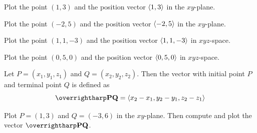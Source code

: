 \documentclass[letterpaper, twoside, 12pt]{book}
\begin{document}
          \begin{problem}
            Plot the point $(1,3)$ and the position vector
            $\langle1,3\rangle$ in the $xy$-plane.
          \end{problem}

          \begin{solution}

          \end{solution}

          \begin{problem}
            Plot the point $(-2,5)$ and the position vector
            $\langle-2,5\rangle$ in the $xy$-plane.
          \end{problem}

          \begin{solution}

          \end{solution}

          \begin{problem}
            Plot the point $(1,1,-3)$ and the position vector
            $\langle1,1,-3\rangle$ in $xyz$-space.
          \end{problem}

          \begin{solution}

          \end{solution}

          \begin{problem}
            Plot the point $(0,5,0)$ and the position vector
            $\langle0,5,0\rangle$ in $xyz$-space.
          \end{problem}

          \begin{solution}

          \end{solution}





\begin{definition}
  Let $P = \left(x_1,y_1,z_1\right)$ and $Q = \left(x_2,y_2,z_2\right).$
  Then the vector with initial point $P$ and terminal point $Q$ is defined as
  \[
    \harpvec{PQ} = \threevec{x_2 - x_1}{y_2 - y_1}{z_2 - z_1}
  \]
\end{definition}

          \begin{problem}
            Plot $P=(1,3)$ and $Q=(-3,6)$ in the $xy$-plane.
            Then compute and plot the vector $\harpvec{PQ}$.
          \end{problem}
\end{document}
